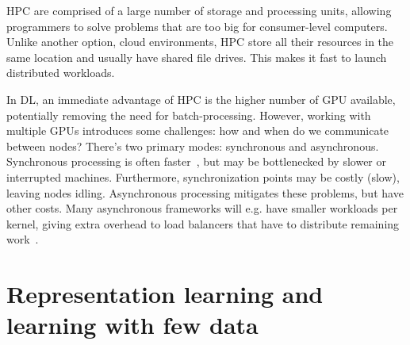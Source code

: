 \documentclass[10pt,twocolumn,letterpaper]{article}
\begin{document}
\gls{HPC} are comprised of a large number of storage and processing units, allowing programmers to solve problems that are too big for consumer-level computers. Unlike another option, cloud environments, \gls{HPC} store all their resources in the same location and usually have shared file drives. This makes it fast to launch distributed workloads. %

In \gls{DL}, an immediate advantage of \gls{HPC} is the higher number of \gls{GPU} available, potentially removing the need for batch-processing. However, working with multiple \gls{GPU}s introduces some challenges: how and when do we communicate between nodes? There's two primary modes: synchronous and asynchronous. Synchronous processing is often faster~\cite{distributedDL}, but may be bottlenecked by slower or interrupted machines. Furthermore, synchronization points may be costly (slow), leaving nodes idling. Asynchronous processing mitigates these problems, but have other costs. Many asynchronous frameworks will e.g. have smaller workloads per kernel, giving extra overhead to load balancers that have to distribute remaining work~\cite{pan2017synchronous}.


\section{Representation learning and learning with few data}\label{sec:cheese}

\end{document}
